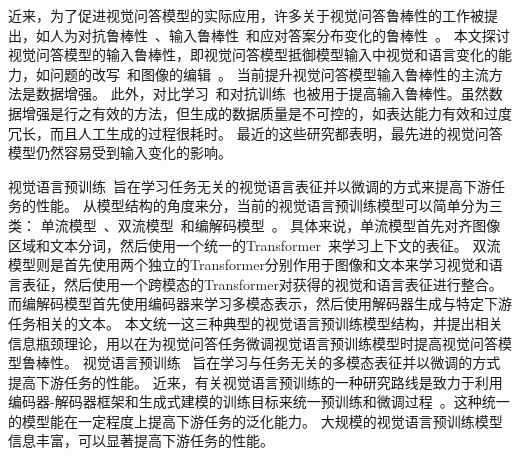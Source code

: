 
近来，为了促进视觉问答模型的实际应用，许多关于视觉问答鲁棒性的工作被提出，如人为对抗鲁棒性~\cite{li2021adversarial,sheng2021human}、输入鲁棒性~\cite{shah2019cycle,whitehead2020learning,agarwal2020towards,kant2021contrast}和应对答案分布变化的鲁棒性~\cite{goyal2017making,jiang2021x}。
本文探讨视觉问答模型的输入鲁棒性，即视觉问答模型抵御模型输入中视觉和语言变化的能力，如问题的改写~\cite{shah2019cycle,whitehead2020learning}和图像的编辑~\cite{agarwal2020towards}。
当前提升视觉问答模型输入鲁棒性的主流方法是数据增强。
此外，对比学习~\cite{kant2021contrast}和对抗训练~\cite{li2020closer}也被用于提高输入鲁棒性。虽然数据增强是行之有效的方法，但生成的数据质量是不可控的，如表达能力有效和过度冗长，而且人工生成的过程很耗时。
最近的这些研究都表明，最先进的视觉问答模型仍然容易受到输入变化的影响。


视觉语言预训练~\cite{zhou2020unified,kim2021vilt,huang2021seeing}旨在学习任务无关的视觉语言表征并以微调的方式来提高下游任务的性能。
从模型结构的角度来分，当前的视觉语言预训练模型可以简单分为三类： 单流模型~\cite{su2019vl,chen2020uniter,gan2020large,li2020oscar,zhang2021vinvl,kim2021vilt}、双流模型~\cite{lu2019vilbert,tan2019lxmert,lu202012,yu2020ernie,li2021scheduled}和编解码模型~\cite{cho2021unifying,li2021align,zeng2022multi,li2022blip,wang2022ofa}。
具体来说，单流模型首先对齐图像区域和文本分词，然后使用一个统一的Transformer~\cite{vaswani2017attention}来学习上下文的表征。
双流模型则是首先使用两个独立的Transformer分别作用于图像和文本来学习视觉和语言表征，然后使用一个跨模态的Transformer对获得的视觉和语言表征进行整合。
而编解码模型首先使用编码器来学习多模态表示，然后使用解码器生成与特定下游任务相关的文本。
本文统一这三种典型的视觉语言预训练模型结构，并提出相关信息瓶颈理论，用以在为视觉问答任务微调视觉语言预训练模型时提高视觉问答模型鲁棒性。
视觉语言预训练~\cite{tan2019lxmert,gan2020large,huang2021seeing,zhang2021vinvl,jia2021scaling,kim2021vilt,li2021align,dou2022empirical,zhong2022regionclip} 旨在学习与任务无关的多模态表征并以微调的方式提高下游任务的性能。
近来，有关视觉语言预训练的一种研究路线是致力于利用编码器-解码器框架和生成式建模的训练目标来统一预训练和微调过程~\cite{cho2021unifying,li2022blip,li2021align,hu2021unit,wang2022ofa}。这种统一的模型能在一定程度上提高下游任务的泛化能力。
大规模的视觉语言预训练模型信息丰富，可以显著提高下游任务的性能。


